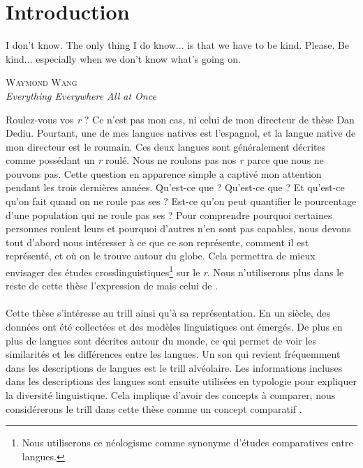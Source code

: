 \chapter*{Introduction}


\setlength{\epigraphwidth}{0.6\textwidth}
\epigraph{I don't know. The only thing I do know... is that we have to be kind. Please. Be kind... especially when we don't know what's going on. }{\textsc{Waymond Wang}\\\textit{Everything Everywhere All at Once}}
\vspace{1.5cm}


Roulez-vous vos \textit{r} ? Ce n'est pas mon cas, ni celui de mon directeur de thèse Dan Dediu. Pourtant, une de mes langues natives est l'espagnol, et la langue native de mon directeur est le roumain. Ces deux langues sont généralement décrites comme possédant un \textit{r} roulé. Nous ne roulons pas nos \textit{r} parce que nous ne pouvons pas. Cette question en apparence simple a captivé mon attention pendant les trois dernières années. Qu'est-ce que  ? Qu'est-ce que  ? Et qu'est-ce qu'on fait quand on ne roule pas ses  ? Est-ce qu'on peut quantifier le pourcentage d'une population qui ne roule pas ses  ? Pour comprendre pourquoi certaines personnes roulent leurs  et pourquoi d'autres n'en sont pas capables, nous devons tout d'abord nous intéresser à ce que ce son représente, comment il est représenté, et où on le trouve autour du globe. Cela permettra de mieux envisager des études crosslinguistiques\footnote{Nous utiliserons ce néologisme comme synonyme d'études comparatives entre langues.} sur le \textit{r}. Nous n'utiliserons plus dans le reste de cette thèse l'expression de  mais celui de .\\
~\\

Cette thèse s'intéresse au trill ainsi qu'à sa représentation. En un siècle, des données ont été collectées et des modèles linguistiques ont émergés. De plus en plus de langues sont décrites autour du monde, ce qui permet de voir les similarités et les différences entre les langues. Un son qui revient fréquemment dans les descriptions de langues est le trill alvéolaire. Les informations incluses dans les descriptions des langues sont ensuite utilisées en typologie pour expliquer la diversité linguistique. Cela implique d'avoir des concepts à comparer, nous considérerons le trill dans cette thèse comme un concept comparatif \parencite{haspelmathComparativeConceptsDescriptive2010,haspelmathChallengeMakingLanguage2016}.\\


